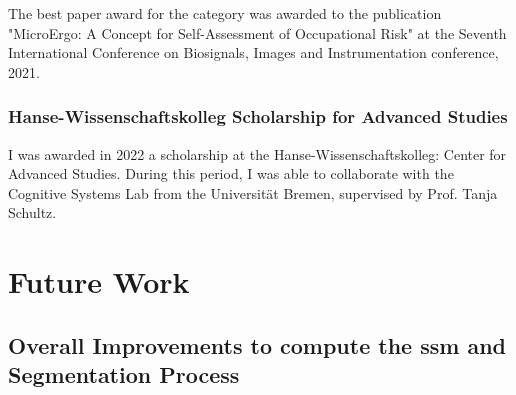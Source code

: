 The best paper award for the category was awarded to the publication "MicroErgo: A Concept for Self-Assessment of Occupational Risk" at the Seventh International Conference on Biosignals, Images and Instrumentation conference, 2021.

\subsubsection{Hanse-Wissenschaftskolleg Scholarship for Advanced Studies}

I was awarded in 2022 a scholarship at the Hanse-Wissenschaftskolleg: Center for Advanced Studies. During this period, I was able to collaborate with the Cognitive Systems Lab from the Universität Bremen, supervised by Prof. Tanja Schultz. 

\section{Future Work}

\subsection{Overall Improvements to compute the \gls{ssm} and Segmentation Process}

